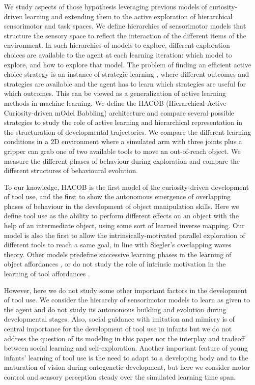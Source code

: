 \documentclass[10pt,letterpaper]{article}
\begin{document}
	We study aspects of those hypothesis leveraging previous models of curiosity-driven learning and extending them to the active exploration of hierarchical sensorimotor and task spaces.
	We define hierarchies of sensorimotor models that structure the sensory space to reflect the interaction of the different items of the environment.
	In such hierarchies of models to explore, different exploration choices are available to the agent at each learning iteration: which model to explore, and how to explore that model.
	The problem of finding an efficient active choice strategy is an instance of strategic learning \cite{nguyen2012}, 
	where different outcomes and strategies are available and the agent has to learn which strategies are useful for which outcomes. 
	This can be viewed as a generalization of active learning methods in machine learning.
	We define the HACOB (Hierarchical Active Curiosity-driven mOdel Babbling) architecture and compare several possible strategies 
	to study the role of active learning and hierarchical representation in the structuration of developmental trajectories.
	We compare the different learning conditions in a $2$D environment where a simulated arm with three joints plus a gripper can grab one of two available tools to move an out-of-reach object.
	We measure the different phases of behaviour during exploration and compare the different structures of behavioural evolution.
	
	To our knowledge, HACOB is the first model of the curiosity-driven development of tool use, 
	and the first to show the autonomous emergence of overlapping phases of behaviour in the development of object manipulation skills.
	Here we define  tool use as the ability to perform different effects on an object with the help of an intermediate object, using some sort of learned inverse mapping.
	Our model is also the first to allow the intrinsically-motivated parallel exploration of different tools to reach a same goal, in line with Siegler's overlapping waves theory.
	Other models predefine successive learning phases in the learning of object affordances \cite{ugur2015}, or do not study the role of intrinsic motivation in the learning of tool affordances \cite{stoytchev2005behavior}.
	
	However, here we do not study some other important factors in the development of tool use.
	We consider the hierarchy of sensorimotor models to learn as given to the agent and do not study its autonomous building and evolution during developmental stages.
	Also, social guidance with imitation and mimicry is of central importance for the development of tool use in infants but we do not address the question
	of its modeling in this paper nor the interplay and tradeoff between social learning and self-exploration.
	Another important feature of young infants' learning of tool use is the need to adapt to a developing body and to the maturation of vision during ontogenetic development, 
	but here we consider motor control and sensory perception steady over the simulated learning time span.
\end{document}
